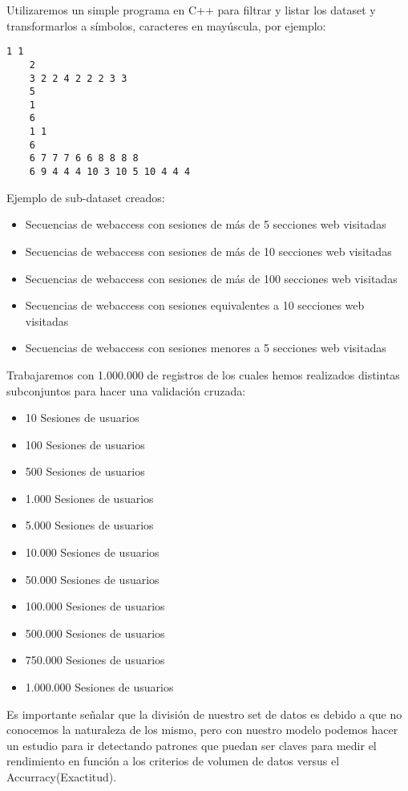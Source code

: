 Utilizaremos un simple programa en C++ para filtrar y listar los dataset y transformarlos a símbolos, caracteres en mayúscula, por ejemplo:

	
	\begin{lstlisting}[frame=single,basicstyle=\ttfamily\tiny,]
	1 1 
	2 
	3 2 2 4 2 2 2 3 3 
	5 
	1 
	6 
	1 1 
	6 
	6 7 7 7 6 6 8 8 8 8 
	6 9 4 4 4 10 3 10 5 10 4 4 4 
	\end{lstlisting}


 Ejemplo de sub-dataset creados:

\begin{itemize}
	\item Secuencias de webaccess con sesiones de más de 5 secciones web visitadas
	\item Secuencias de webaccess con sesiones de más de 10 secciones web visitadas
	\item Secuencias de webaccess con sesiones de más de 100 secciones web visitadas
	\item Secuencias de webaccess con sesiones equivalentes a 10 secciones web visitadas
	\item Secuencias de webaccess con sesiones menores a 5 secciones web visitadas
\end{itemize}


Trabajaremos con 1.000.000 de registros de los cuales hemos realizados distintas subconjuntos para hacer una validación cruzada:

\begin{itemize}
	\item 10 Sesiones de usuarios
	\item 100 Sesiones de usuarios
	\item 500 Sesiones de usuarios
	\item 1.000 Sesiones de usuarios
	\item 5.000 Sesiones de usuarios
	\item 10.000 Sesiones de usuarios
	\item 50.000 Sesiones de usuarios
	\item 100.000 Sesiones de usuarios
	\item 500.000 Sesiones de usuarios
	\item 750.000 Sesiones de usuarios
	\item 1.000.000 Sesiones de usuarios
\end{itemize}


Es importante señalar que la división de nuestro set de datos es debido a que no conocemos la naturaleza de los mismo, pero con nuestro modelo podemos hacer un estudio para ir detectando patrones que puedan ser claves para medir el rendimiento en función a los criterios de volumen de datos versus el Accurracy(Exactitud).






